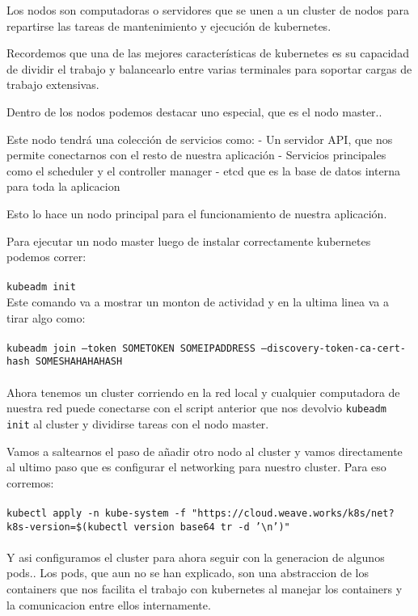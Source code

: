 \documentclass[11pt]{article} %
\begin{document}
Los nodos son computadoras o servidores que se unen a un cluster de nodos para repartirse las tareas de mantenimiento y ejecución de kubernetes.

Recordemos que una de las mejores características de kubernetes es su capacidad de dividir el trabajo y balancearlo entre varias terminales para soportar cargas de trabajo extensivas.

Dentro de los nodos podemos destacar uno especial, que es el nodo master..

Este nodo tendrá una colección de servicios como:
    - Un servidor API, que nos permite conectarnos con el resto de nuestra aplicación
    - Servicios principales como el scheduler y el controller manager
    - etcd que es la base de datos interna para toda la aplicacion

Esto lo hace un nodo principal para el funcionamiento de nuestra aplicación.

Para ejecutar un nodo master luego de instalar correctamente kubernetes podemos correr:\\ \\
    \texttt{kubeadm init} \\

Este comando va a mostrar un monton de actividad y en la ultima linea va a tirar algo como:\\ \\

    \texttt{kubeadm join --token SOMETOKEN SOMEIPADDRESS --discovery-token-ca-cert-hash SOMESHAHAHAHASH} \\ \\

Ahora tenemos un cluster corriendo en la red local y cualquier computadora de nuestra red puede conectarse con el script anterior que nos devolvio \texttt{kubeadm init} al cluster y dividirse tareas con el nodo master.

Vamos a saltearnos el paso de añadir otro nodo al cluster y vamos directamente al ultimo paso que es configurar el networking para nuestro cluster. Para eso corremos:\\ \\
    \texttt{kubectl apply -n kube-system -f "https://cloud.weave.works/k8s/net?k8s-version=\$(kubectl version \textbar base64 \textbar  tr -d '\textbackslash n')"} \\ \\

Y asi configuramos el cluster para ahora seguir con la generacion de algunos pods.. Los pods, que aun no se han explicado, son una abstraccion de los containers que nos facilita el trabajo con kubernetes al manejar los containers y la comunicacion entre ellos internamente. 
\end{document}
